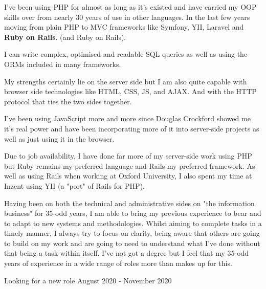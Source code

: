 \topHeading{}



I've been using PHP for almost as long as it's existed
and have carried my OOP skills over from nearly 30 years
of use in other languages.
In the last few years moving from plain PHP to MVC frameworks
like Symfony, YII, Laravel
\ifnum{}
and \textbf{Ruby on Rails}.
\else
(and Ruby on Rails).
\fi

I can write complex, optimised and readable SQL queries
as well as using the ORMs included in many frameworks.

\ifnum{}
    My strengths certainly lie on the server side
    but I am also quite capable with browser side
    technologies like HTML, CSS, JS, and AJAX.
    And with the HTTP protocol that ties the two sides together.
\fi

\ifnum{}
    I've been using JavaScript more and more since Douglas Crockford
    showed me it's real power and have been incorporating more of it
    into server-side projects as well as just using it in the browser.
\fi

\ifnum{}
    Due to job availability, I have done far more of my server-side work
    using PHP but Ruby remains my preferred language
    and Rails my preferred framework.
    As well as using Rails when working at Oxford University,
    I also spent my time at Inzent using YII (a "port" of Rails for PHP).
\fi

\ifnum{}
    Having been on both the technical and administrative sides on
    "the information business" for 35-odd years,
    I am able to bring my previous experience to bear and to adapt
    to new systems and methodologies.
    Whilst aiming to complete tasks in a timely manner,
    I always try to focus on clarity,
    being aware that others are going to build on my work
    and are going to need to understand what I've done
    without that being a task within itself.
\else
    I've not got a degree but I feel that my 35-odd years of
    experience in a wide range of roles more than makes up for this.
\fi


\jobHeading
    {Looking for a new role}
    {August 2020 - November 2020}

